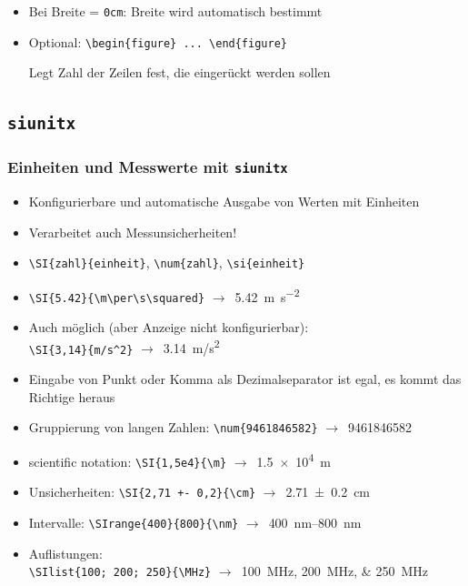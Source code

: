 \begin{frame}[<+->][fragile]
\begin{itemize}
\begin{columns}
		\end{columns}
		\item Bei Breite = \texttt{0cm}: Breite wird automatisch bestimmt
		\item Optional: \lstinline!\begin{figure} ... \end{figure}!
		
		Legt Zahl der Zeilen fest, die eingerückt werden sollen
	\end{itemize}
\end{frame}

\subsection{\texttt{siunitx}}

\begin{frame}[<+->][fragile]
	\frametitle{Einheiten und Messwerte mit \texttt{siunitx}}

	\begin{itemize}
		\item Konfigurierbare und automatische Ausgabe von Werten mit Einheiten
		\item Verarbeitet auch Messunsicherheiten!
		\item \lstinline!\SI{zahl}{einheit}!, \lstinline!\num{zahl}!, \lstinline!\si{einheit}!
		\item \lstinline!\SI{5.42}{\m\per\s\squared}!
		$\rightarrow$~{\rmfamily\SI{5.42}{\m\per\s\squared}}
		\DeactivateWarningFilters
		\item Auch möglich (aber Anzeige nicht konfigurierbar):\\
		\lstinline!\SI{3,14}{m/s^2}!
		$\rightarrow$~{\rmfamily\SI{3,14}{m/s^2}}
		\item Eingabe von Punkt oder Komma als Dezimalseparator ist egal, es kommt das Richtige heraus
		\item Gruppierung von langen Zahlen: \lstinline!\num{9461846582}! $\rightarrow$~{\rmfamily\num{9461846582}}
		\item scientific notation: \lstinline!\SI{1,5e4}{\m}!
		$\rightarrow$~{\rmfamily\SI{1,5e4}{\m}}
		\item Unsicherheiten: \lstinline!\SI{2,71 +- 0,2}{\cm}!
		$\rightarrow$~{\rmfamily\SI{2,71 +- 0,2}{\cm}}
		\item Intervalle: \lstinline!\SIrange{400}{800}{\nm}!
		$\rightarrow$~{\rmfamily\SIrange{400}{800}{\nm}}
		\item Auflistungen:\\
		\lstinline!\SIlist{100; 200; 250}{\MHz}!
		$\rightarrow$~{\rmfamily\SIlist{100; 200; 250}{\MHz}}
	\end{itemize}
\end{frame}

